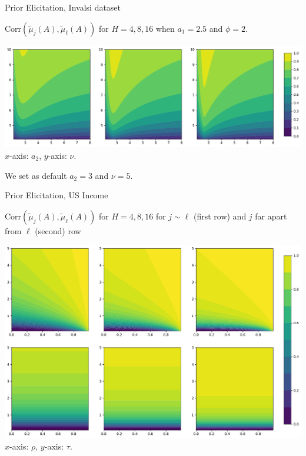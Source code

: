 \documentclass[10.5pt, aspectratio=169]{beamer} %
\newcommand{\mutilde}{\widetilde{\mu}}
\begin{document}
\begin{frame}{Prior Elicitation, Invalsi dataset}

$\mbox{Corr}(\mutilde_j(A), \mutilde_\ell(A))$ for $H=4, 8, 16$ when $a_1 = 2.5$ and $\phi=2$.

\vspace{0.5cm}

\begin{center}
	\includegraphics[width=0.9\linewidth]{corr_mgp} \\
	$x$-axis: $a_2$, $y$-axis: $\nu$.
\end{center}

\pause

\medskip

We set as default $a_2 = 3$ and $\nu=5$.
\end{frame}


\begin{frame}{Prior Elicitation, US Income}

$\mbox{Corr}(\mutilde_j(A), \mutilde_\ell(A))$ for $H=4, 8, 16$ for $j \sim \ell$ (first row) and $j$ far apart from $\ell$ (second) row

\begin{center}
	\includegraphics[width=0.6\linewidth]{corr_lgmrf} \\
	$x$-axis: $\rho$, $y$-axis: $\tau$.
\end{center}

\end{frame}
\end{document}
